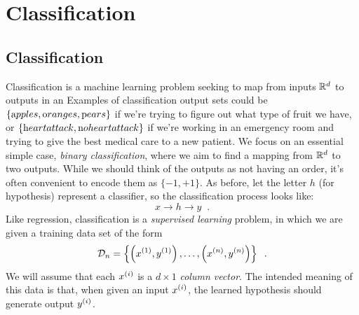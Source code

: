 \chapter{Classification}
\label{chap-classification}

\section{Classification}

Classification is a machine learning problem seeking to map from
inputs $\mathbb{R}^d$ to outputs in an 
Examples of classification output sets could be $\{{\text apples}, {\text oranges}, {\text pears}\}$ if we're
trying to figure out what type of fruit we have, or
$\{{\text heart attack}, {\text no heart attack}\}$ if we're working in an emergency
room and trying to give the best medical care to a new patient.
We focus on an essential simple
case, {\em binary classification}, where we aim to find a mapping from $\mathbb{R}^d$ to
two outputs. 
While we should think of the outputs as not having an order, it's
often convenient to encode them as $\{-1, +1\}$.  As before, let the letter $h$ (for
hypothesis) represent a classifier, so the classification process
looks like:
$$ x \rightarrow \boxed{h} \rightarrow y \;\;.$$
%
%
Like regression, classification is a {\em{supervised learning}} problem, in which we
are given a training data set of the form
\[ {\cal D}_n = \left\{\left(x^{(1)}, y^{(1)}\right), \dots, \left(x^{(n)},
  y^{(n)}\right)\right\} \;\;.\]
We will assume that each $x^{(i)}$ is a $d \times 1$ {\em column
    vector}. The intended meaning of this data is that, when given an input
$x^{(i)}$, the learned hypothesis should generate output
$y^{(i)}$.

